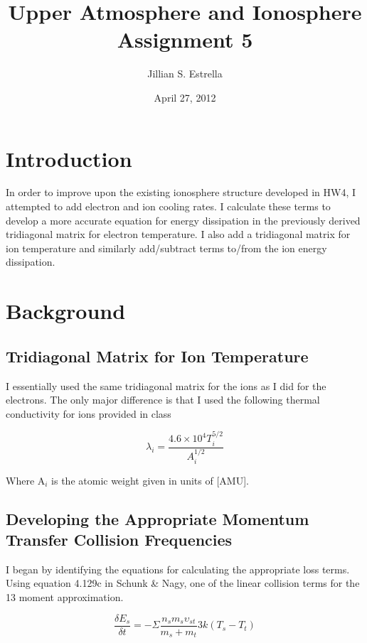 \documentclass[10pt]{article}
\begin{document}
\title{Upper Atmosphere and Ionosphere Assignment 5}
\author{Jillian S. Estrella}
\date{April 27, 2012}
\maketitle

\section{Introduction}
In order to improve upon the existing ionosphere structure developed in HW4, I attempted to add electron and ion cooling rates. I calculate these terms to develop a more accurate equation for energy dissipation in the previously derived tridiagonal matrix for electron temperature. I also add a tridiagonal matrix for ion temperature and similarly add/subtract terms to/from the ion energy dissipation.

\section{Background}
\subsection{Tridiagonal Matrix for Ion Temperature}
I essentially used the same tridiagonal matrix for the ions as I did for the electrons. The only major difference is that I used the following thermal conductivity for ions provided in class

\begin{equation}
\lambda _{i} = \frac{4.6 \times 10^{4} T_{i}^{5/2}}{A_{i}^{1/2}}
\end{equation}

\noindent Where A$_{i}$ is the atomic weight given in units of [AMU].

\subsection{Developing the Appropriate Momentum Transfer Collision Frequencies}
I began by identifying the equations for calculating the appropriate loss terms. Using equation 4.129c in Schunk \& Nagy, one of the linear collision terms for the 13 moment approximation.

\begin{equation}
\frac{\delta E_{s}}{ \delta t} = - \Sigma \frac{n_{s}m_{s}\upsilon _{st}}{m_{s} + m_{t}} 3k(T_{s}-T_{t})
\end{equation}
\end{document}
